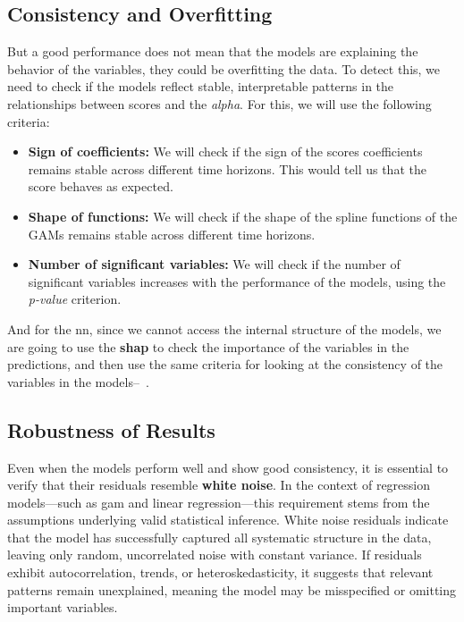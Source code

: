 \documentclass[11pt,english,a4paper,hidelinks]{book}
\begin{document}
\subsection{Consistency and Overfitting}
But a good performance does not mean that the models are explaining the behavior of the variables, they could be overfitting the data. To detect this, we need to check if the models reflect stable, interpretable patterns in the relationships between scores and the \textit{alpha}. For this, we will use the following criteria:
\begin{itemize}
    \item \textbf{Sign of coefficients:} We will check if the sign of the scores coefficients remains stable across different time horizons. This would tell us that the score behaves as expected. 
    \item \textbf{Shape of functions:} We will check if the shape of the spline functions of the GAMs remains stable across different time horizons. 
    \item \textbf{Number of significant variables:} We will check if the number of significant variables increases with the performance of the models, using the \textit{p-value} criterion.
\end{itemize}

\noindent And for the \acrshort{nn}, since we cannot access the internal structure of the models, we are going to use the \textbf{\gls{shap}} to check the importance of the variables in the predictions, and then use the same criteria for looking at the consistency of the variables in the models--~\textcite{lundberg2017unified}.

\subsection{Robustness of Results}
Even when the models perform well and show good consistency, it is essential to verify that their residuals resemble \textbf{white noise}. In the context of regression models—such as \acrshort{gam} and linear regression—this requirement stems from the assumptions underlying valid statistical inference. White noise residuals indicate that the model has successfully captured all systematic structure in the data, leaving only random, uncorrelated noise with constant variance. If residuals exhibit autocorrelation, trends, or heteroskedasticity, it suggests that relevant patterns remain unexplained, meaning the model may be misspecified or omitting important variables. 
\end{document}
